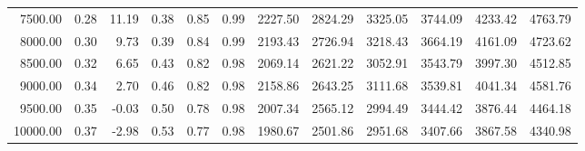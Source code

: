 \begin{table}[ht]
\begin{tabular}{rrrrrrrrrrrr}
  7500.00 & 0.28 & 11.19 & 0.38 & 0.85 & 0.99 & 2227.50 & 2824.29 & 3325.05 & 3744.09 & 4233.42 & 4763.79 \\ 
  8000.00 & 0.30 & 9.73 & 0.39 & 0.84 & 0.99 & 2193.43 & 2726.94 & 3218.43 & 3664.19 & 4161.09 & 4723.62 \\ 
  8500.00 & 0.32 & 6.65 & 0.43 & 0.82 & 0.98 & 2069.14 & 2621.22 & 3052.91 & 3543.79 & 3997.30 & 4512.85 \\ 
  9000.00 & 0.34 & 2.70 & 0.46 & 0.82 & 0.98 & 2158.86 & 2643.25 & 3111.68 & 3539.81 & 4041.34 & 4581.76 \\ 
  9500.00 & 0.35 & -0.03 & 0.50 & 0.78 & 0.98 & 2007.34 & 2565.12 & 2994.49 & 3444.42 & 3876.44 & 4464.18 \\ 
  10000.00 & 0.37 & -2.98 & 0.53 & 0.77 & 0.98 & 1980.67 & 2501.86 & 2951.68 & 3407.66 & 3867.58 & 4340.98 \\ 
   \hline
\end{tabular}
\end{table}
